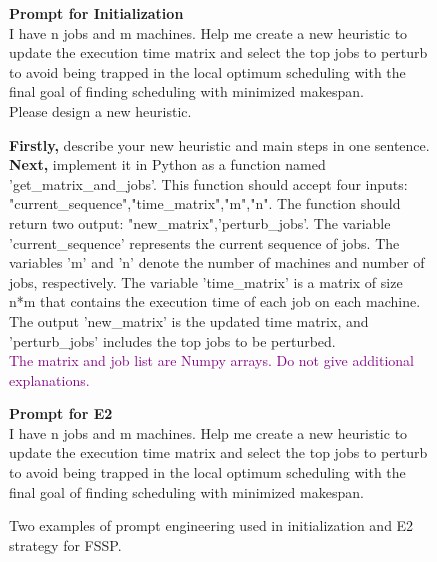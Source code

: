 \begin{figure}[t]
    \centering
    \caption{Two examples of prompt engineering used in initialization and E2 strategy for FSSP.}
    \label{fig:prompt_fssp}

\begin{minipage}{0.38\textwidth}
\small
\begin{dialogbox}
  \textbf{Prompt for Initialization} \\
  
  \textcolor {darkbrown}{I have n jobs and m machines. Help me create a new heuristic to update the execution time matrix and select the top jobs to perturb to avoid being trapped in the local optimum scheduling with the final goal of finding scheduling with minimized makespan.} \\

  Please design a new heuristic.
  
  \textbf{Firstly,} describe your \textcolor{navyblue}{new heuristic and main steps in one sentence}. \\
  \textbf{Next,} implement it in Python as a function named \textcolor{navyblue}{'get\_matrix\_and\_jobs'}. This function should accept \textcolor{navyblue}{four inputs: "current\_sequence","time\_matrix","m","n"}. The function should return \textcolor{navyblue}{two output: "new\_matrix",'perturb\_jobs'}. \textcolor{navyblue}{The variable 'current\_sequence' represents the current sequence of jobs. The variables 'm' and 'n' denote the number of machines and number of jobs, respectively. The variable 'time\_matrix' is a matrix of size n*m that contains the execution time of each job on each machine. The output 'new\_matrix' is the updated time matrix, and 'perturb\_jobs' includes the top jobs to be perturbed.}  \\

  \textcolor{purple}{The matrix and job list are Numpy arrays. Do not give additional explanations.}
\end{dialogbox}
\end{minipage}
\begin{minipage}{0.61\textwidth}
\small
\begin{dialogbox}
  \textbf{Prompt for E2} \\
  
  \textcolor[HTML]{8B4513}{I have n jobs and m machines. Help me create a new heuristic to update the execution time matrix and select the top jobs to perturb to avoid being trapped in the local optimum scheduling with the final goal of finding scheduling with minimized makespan.} \\


\end{dialogbox}
\end{minipage}
\end{figure}
